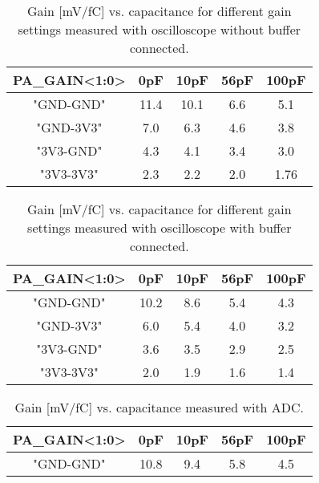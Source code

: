 \documentclass[../main/thesis.tex]{subfiles}
\begin{document}
\begin{table}[h!]
	\begin{center}
		\caption{Gain [mV/fC] vs. capacitance for different gain settings measured with oscilloscope without buffer connected.}
		\label{tab-gain-nobuffer}
		\begin{tabular}{ccccc}\toprule
			\textbf{PA\_GAIN<1:0>} & \textbf{0pF}  & \textbf{10pF} & \textbf{56pF} & \textbf{100pF} \\ \midrule
			"GND-GND"     & 11.4 & 10.1 & 6.6  & 5.1   \\
			"GND-3V3"     & 7.0    & 6.3  & 4.6  & 3.8   \\
			"3V3-GND"     & 4.3  & 4.1  & 3.4  & 3.0     \\
			"3V3-3V3"     & 2.3  & 2.2  & 2.0    & 1.76 \\ \bottomrule
		\end{tabular}
	\end{center}
\end{table}

\begin{table}[h!]
	\begin{center}
		\caption{Gain [mV/fC] vs. capacitance for different gain settings measured with oscilloscope with buffer connected.}
		\label{tab-gain-wbuffer}
		\begin{tabular}{ccccc}\toprule
			\textbf{PA\_GAIN<1:0>} & \textbf{0pF}  & \textbf{10pF} & \textbf{56pF} & \textbf{100pF} \\ \midrule
			"GND-GND"     & 10.2 & 8.6  & 5.4  & 4.3   \\
			"GND-3V3"     & 6.0    & 5.4  & 4.0    & 3.2   \\
			"3V3-GND"     & 3.6  & 3.5  & 2.9  & 2.5   \\
			"3V3-3V3"     & 2.0    & 1.9  & 1.6  & 1.4 \\ \bottomrule
		\end{tabular}
	\end{center}
\end{table}


\begin{table}[h!]
	\begin{center}
		\caption{Gain [mV/fC] vs. capacitance measured with ADC.}
		\label{tab-gain-adc}
		\begin{tabular}{ccccc}\toprule
			\textbf{PA\_GAIN<1:0>} & \textbf{0pF}  & \textbf{10pF} & \textbf{56pF} & \textbf{100pF} \\ \midrule
			"GND-GND"     & 10.8 & 9.4  & 5.8  & 4.5   \\ \bottomrule
		\end{tabular}
	\end{center}
\end{table}
\end{document}
